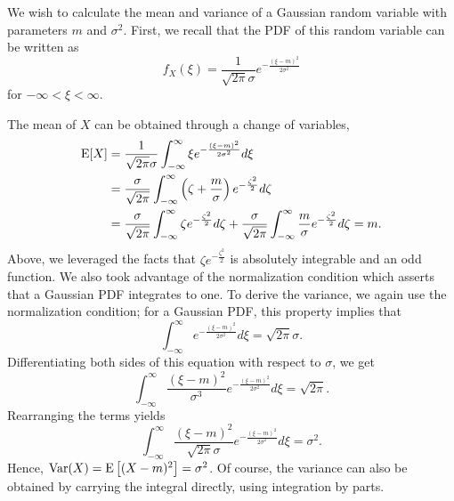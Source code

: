 \begin{example}
We wish to calculate the mean and variance of a Gaussian random variable with parameters $m$ and $\sigma^2$.
First, we recall that the PDF of this random variable can be written as
\begin{equation*}
f_X (\xi) = \frac{1}{\sqrt{2 \pi} \sigma} e^{-\frac{(\xi - m)^2}{2\sigma^2}}
\end{equation*}
for $- \infty < \xi < \infty$.

The mean of $X$ can be obtained through a change of variables,
\begin{equation*}
\begin{split}
\mathrm{E} [X]
&= \frac{1}{\sqrt{2 \pi} \sigma} \int_{- \infty}^{\infty} \xi e^{-\frac{(\xi-m)^2}{2\sigma^2}} d\xi \\
&= \frac{\sigma}{\sqrt{2 \pi}} \int_{- \infty}^{\infty}
\left( \zeta+\frac{m}{\sigma} \right) e^{-\frac{\zeta^2}{2}} d\zeta \\
&= \frac{\sigma}{\sqrt{2 \pi}} \int_{- \infty}^{\infty}
\zeta e^{-\frac{\zeta^2}{2}} d\zeta
+ \frac{\sigma}{\sqrt{2 \pi}} \int_{- \infty}^{\infty}
\frac{m}{\sigma} e^{-\frac{\zeta^2}{2}} d\zeta
= m.
\end{split}
\end{equation*}
Above, we leveraged the facts that $\zeta e^{-\frac{\zeta^2}{2}}$ is absolutely integrable and an odd function.
We also took advantage of the normalization condition which asserts that a Gaussian PDF integrates to one.
To derive the variance, we again use the normalization condition; for a Gaussian PDF, this property implies that
\begin{equation*}
\int_{-\infty}^{\infty} e^{- \frac{(\xi-m)^2}{2 \sigma^2}} d\xi
= \sqrt{2 \pi} \sigma .
\end{equation*}
Differentiating both sides of this equation with respect to $\sigma$, we get
\begin{equation*}
\int_{-\infty}^{\infty} \frac{(\xi-m)^2}{\sigma^3}
e^{- \frac{(\xi-m)^2}{2 \sigma^2}} d\xi
= \sqrt{2 \pi} .
\end{equation*}
Rearranging the terms yields
\begin{equation*}
\int_{-\infty}^{\infty} \frac{(\xi-m)^2}{\sqrt{2 \pi} \sigma}
e^{- \frac{(\xi-m)^2}{2 \sigma^2}} d\xi
= \sigma^2 .
\end{equation*}
Hence, $\mathrm{Var}(X) = \mathrm{E} \left[ (X-m)^2 \right] = \sigma^2$.
Of course, the variance can also be obtained by carrying the integral directly, using integration by parts.
\end{example}


